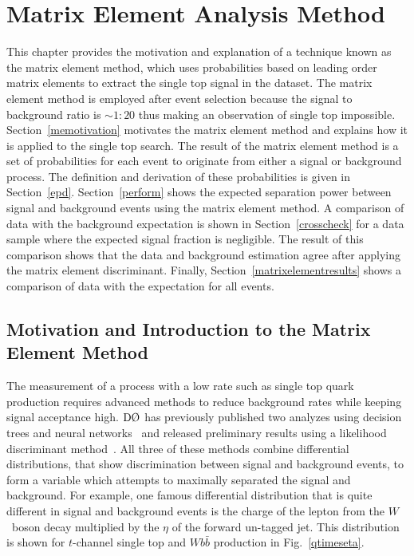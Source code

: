  \chapter{Matrix Element Analysis Method}
 \label{matrixelement}

This chapter provides the motivation and explanation of a technique known as the matrix element method, which uses probabilities based on leading order matrix elements to extract the single top signal in the dataset. The matrix element method is employed after event selection because the signal to background ratio is $\sim1:20$ thus making an observation of single top impossible. Section~\ref{memotivation} motivates the matrix element method and explains how it is applied to the single  top search. The result of the matrix element method is a set of probabilities for each event to originate from either a signal or background process. The definition and derivation of these probabilities is given in Section~\ref{epd}. Section~\ref{perform} shows the expected separation power between signal and background events using the matrix element method. A comparison of data with the background expectation is shown in Section~\ref{crosscheck} for a data sample where the expected signal fraction is negligible. The result of this comparison shows that the data and background estimation agree after applying the matrix element discriminant. Finally, Section~\ref{matrixelementresults} shows a comparison of data with the expectation for all events.

\section{Motivation and Introduction to the Matrix Element Method}
\label{method-overview}
\label{memotivation}

The measurement of a process with a low rate such as single top quark production requires advanced methods to reduce background rates while keeping signal acceptance high. $\dzero$ has previously published two analyzes using decision trees and neural networks~\cite{Abazov:2005zz,Abazov:2006uq} and released preliminary results using a likelihood discriminant method~\cite{run2-d0-370}. All three of these methods combine differential distributions, that show discrimination between signal and background events, to form a variable which attempts to maximally separated the signal and background. For example, one famous differential distribution that is quite different in signal and background events is the charge of the lepton from the $W$~boson decay multiplied by the $\eta$ of the forward un-tagged jet. This distribution is shown for $t$-channel single top and $Wb\bar{b}$ production in Fig.~\ref{qtimeseta}.

